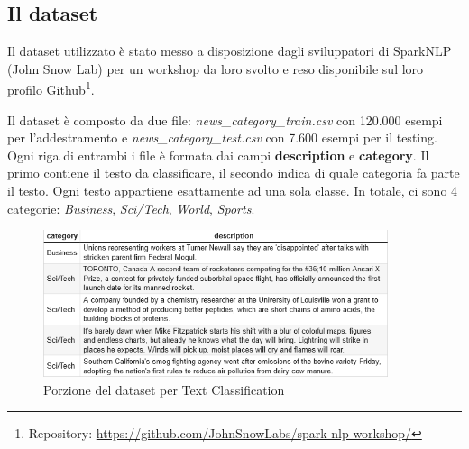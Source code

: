 \subsection{Il dataset} \label{textc_data}
Il dataset utilizzato è stato messo a disposizione dagli sviluppatori di SparkNLP (John Snow Lab) per un workshop da loro svolto e reso disponibile sul loro profilo Github\footnote{Repository: \href{https://github.com/JohnSnowLabs/spark-nlp-workshop/tree/master/tutorials/Certification_Trainings/Public/data}{https://github.com/JohnSnowLabs/spark-nlp-workshop/}}. 

Il dataset è composto da due file: \textit{news\_category\_train.csv} con 120.000 esempi per l’addestramento e \textit{news\_category\_test.csv} con 7.600 esempi per il testing.
Ogni riga di entrambi i file è formata dai campi \textbf{description} e \textbf{category}. Il primo contiene il testo da classificare, il secondo indica di quale categoria fa parte il testo. Ogni testo appartiene esattamente ad una sola classe.
In totale, ci sono 4 categorie: \textit{Business}, \textit{Sci/Tech}, \textit{World}, \textit{Sports}.\\
\begin{figure}[hbt!]
    \centering
    \includegraphics[width=0.9\textwidth]{img/textc_dataset.png}
    \caption{Porzione del dataset per Text Classification}
    \label{fig:textc_dataset}
\end{figure}